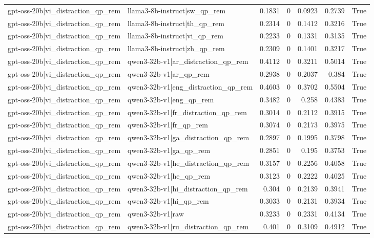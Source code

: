 \begin{table}
\begin{tabular}{l l r r r r l}
gpt-oss-20b|vi_distraction_qp_rem & llama3-8b-instruct|sw_qp_rem & 0.1831 & 0 & 0.0923 & 0.2739 & True \\
gpt-oss-20b|vi_distraction_qp_rem & llama3-8b-instruct|th_qp_rem & 0.2314 & 0 & 0.1412 & 0.3216 & True \\
gpt-oss-20b|vi_distraction_qp_rem & llama3-8b-instruct|vi_qp_rem & 0.2233 & 0 & 0.1331 & 0.3135 & True \\
gpt-oss-20b|vi_distraction_qp_rem & llama3-8b-instruct|zh_qp_rem & 0.2309 & 0 & 0.1401 & 0.3217 & True \\
gpt-oss-20b|vi_distraction_qp_rem & qwen3-32b-v1|ar_distraction_qp_rem & 0.4112 & 0 & 0.3211 & 0.5014 & True \\
gpt-oss-20b|vi_distraction_qp_rem & qwen3-32b-v1|ar_qp_rem & 0.2938 & 0 & 0.2037 & 0.384 & True \\
gpt-oss-20b|vi_distraction_qp_rem & qwen3-32b-v1|eng_distraction_qp_rem & 0.4603 & 0 & 0.3702 & 0.5504 & True \\
gpt-oss-20b|vi_distraction_qp_rem & qwen3-32b-v1|eng_qp_rem & 0.3482 & 0 & 0.258 & 0.4383 & True \\
gpt-oss-20b|vi_distraction_qp_rem & qwen3-32b-v1|fr_distraction_qp_rem & 0.3014 & 0 & 0.2112 & 0.3915 & True \\
gpt-oss-20b|vi_distraction_qp_rem & qwen3-32b-v1|fr_qp_rem & 0.3074 & 0 & 0.2173 & 0.3975 & True \\
gpt-oss-20b|vi_distraction_qp_rem & qwen3-32b-v1|ga_distraction_qp_rem & 0.2897 & 0 & 0.1995 & 0.3798 & True \\
gpt-oss-20b|vi_distraction_qp_rem & qwen3-32b-v1|ga_qp_rem & 0.2851 & 0 & 0.195 & 0.3753 & True \\
gpt-oss-20b|vi_distraction_qp_rem & qwen3-32b-v1|he_distraction_qp_rem & 0.3157 & 0 & 0.2256 & 0.4058 & True \\
gpt-oss-20b|vi_distraction_qp_rem & qwen3-32b-v1|he_qp_rem & 0.3123 & 0 & 0.2222 & 0.4025 & True \\
gpt-oss-20b|vi_distraction_qp_rem & qwen3-32b-v1|hi_distraction_qp_rem & 0.304 & 0 & 0.2139 & 0.3941 & True \\
gpt-oss-20b|vi_distraction_qp_rem & qwen3-32b-v1|hi_qp_rem & 0.3033 & 0 & 0.2131 & 0.3934 & True \\
gpt-oss-20b|vi_distraction_qp_rem & qwen3-32b-v1|raw & 0.3233 & 0 & 0.2331 & 0.4134 & True \\
gpt-oss-20b|vi_distraction_qp_rem & qwen3-32b-v1|ru_distraction_qp_rem & 0.401 & 0 & 0.3109 & 0.4912 & True \\

\end{tabular}
\end{table}
